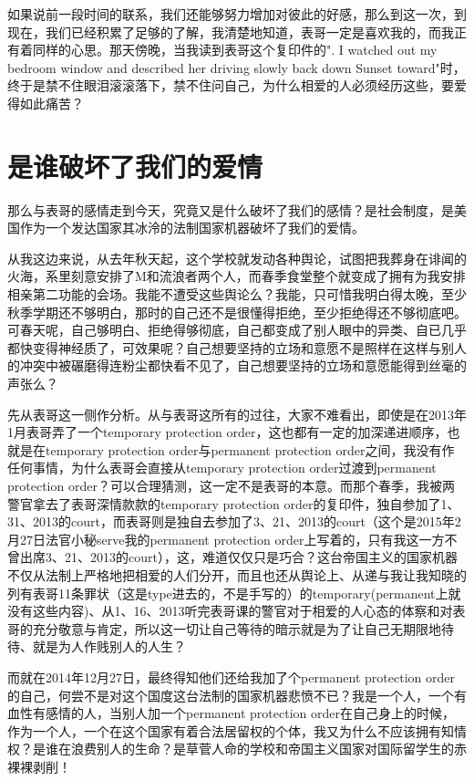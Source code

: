 \documentclass[12pt]{book}
\begin{document}
如果说前一段时间的联系，我们还能够努力增加对彼此的好感，那么到这一次，到现在，我们已经积累了足够的了解，我清楚地知道，表哥一定是喜欢我的，而我正有着同样的心思。那天傍晚，当我读到表哥这个复印件的". I watched out my bedroom window and described her driving slowly back down Sunset toward"时，终于是禁不住眼泪滚滚落下，禁不住问自己，为什么相爱的人必须经历这些，要爱得如此痛苦？
\chapter{是谁破坏了我们的爱情}
\label{sec-44}
那么与表哥的感情走到今天，究竟又是什么破坏了我们的感情？是社会制度，是美国作为一个发达国家其冰泠的法制国家机器破坏了我们的爱情。

从我这边来说，从去年秋天起，这个学校就发动各种舆论，试图把我葬身在诽闻的火海，系里刻意安排了M和流浪者两个人，而春季食堂整个就变成了拥有为我安排相亲第二功能的会场。我能不遭受这些舆论么？我能，只可惜我明白得太晚，至少秋季学期还不够明白，那时的自己还不是很懂得拒绝，至少拒绝得还不够彻底吧。可春天呢，自己够明白、拒绝得够彻底，自己都变成了别人眼中的异类、自已几乎都快变得神经质了，可效果呢？自己想要坚持的立场和意愿不是照样在这样与别人的冲突中被碾磨得连粉尘都快看不见了，自己想要坚持的立场和意愿能得到丝毫的声张么？

先从表哥这一侧作分析。从与表哥这所有的过往，大家不难看出，即使是在2013年1月表哥弄了一个temporary protection order，这也都有一定的加深递进顺序，也就是在temporary protection order与permanent protection order之间，我没有作任何事情，为什么表哥会直接从temporary protection order过渡到permanent protection order？可以合理猜测，这一定不是表哥的本意。而那个春季，我被两警官拿去了表哥深情款款的temporary protection order的复印件，独自参加了1、31、2013的court，而表哥则是独自去参加了3、21、2013的court（这个是2015年2月27日法官小秘serve我的permanent protection order上写着的，只有我这一方不曾出席3、21、2013的court），这，难道仅仅只是巧合？这台帝国主义的国家机器不仅从法制上严格地把相爱的人们分开，而且也还从舆论上、从递与我让我知晓的列有表哥11条罪状（这是type进去的，不是手写的）的temporary(permanent上就没有这些内容)、从1、16、2013听完表哥课的警官对于相爱的人心态的体察和对表哥的充分敬意与肯定，所以这一切让自己等待的暗示就是为了让自己无期限地待待、就是为人作贱别人的人生？

而就在2014年12月27日，最终得知他们还给我加了个permanent protection order的自己，何尝不是对这个国度这台法制的国家机器悲愤不已？我是一个人，一个有血性有感情的人，当别人加一个permanent protection order在自己身上的时候，作为一个人，一个在这个国家有着合法居留权的个体，我又为什么不应该拥有知情权？是谁在浪费别人的生命？是草菅人命的学校和帝国主义国家对国际留学生的赤裸裸剥削！
\end{document}
